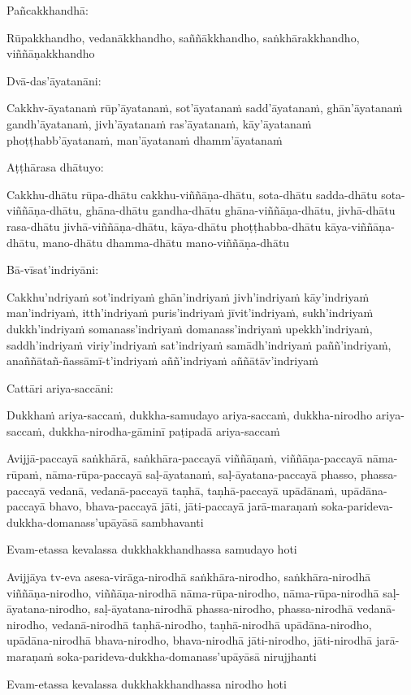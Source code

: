 \begin{paritta}

Pañcakkhandhā:

Rūpakkhandho, vedanākkhandho, saññākkhandho, saṅkhārakkhandho,
viññāṇakkhandho

Dvā-das'āyatanāni:

Cakkhv-āyatanaṁ rūp'āyatanaṁ, sot'āyatanaṁ sadd'āyatanaṁ, ghān'āyatanaṁ
gandh'āyatanaṁ, jivh'āyatanaṁ ras'āyatanaṁ, kāy'āyatanaṁ
phoṭṭhabb'āyatanaṁ, man'āyatanaṁ dhamm'āyatanaṁ

Aṭṭhārasa dhātuyo:

Cakkhu-dhātu rūpa-dhātu cakkhu-viññāṇa-dhātu, sota-dhātu sadda-dhātu
sota-viññāṇa-dhātu, ghāna-dhātu gandha-dhātu ghāna-viññāṇa-dhātu,
jivhā-dhātu rasa-dhātu jivhā-viññāṇa-dhātu, kāya-dhātu phoṭṭhabba-dhātu
kāya-viññāṇa-dhātu, mano-dhātu dhamma-dhātu mano-viññāṇa-dhātu

Bā-vīsat'indriyāni:

Cakkhu'ndriyaṁ sot'indriyaṁ ghān'indriyaṁ jivh'indriyaṁ kāy'indriyaṁ
man'indriyaṁ, itth'indriyaṁ puris'indriyaṁ jīvit'indriyaṁ, sukh'indriyaṁ
dukkh'indriyaṁ somanass'indriyaṁ domanass'indriyaṁ upekkh'indriyaṁ,
saddh'indriyaṁ viriy'indriyaṁ sat'indriyaṁ samādh'indriyaṁ
paññ'indriyaṁ, anaññātañ-ñassāmī-t'indriyaṁ aññ'indriyaṁ
aññātāv'indriyaṁ

Cattāri ariya-saccāni:

Dukkhaṁ ariya-saccaṁ, dukkha-samudayo ariya-saccaṁ, dukkha-nirodho
ariya-saccaṁ, dukkha-nirodha-gāminī paṭipadā ariya-saccaṁ

Avijjā-paccayā saṅkhārā, saṅkhāra-paccayā viññāṇaṁ, viññāṇa-paccayā
nāma-rūpaṁ, nāma-rūpa-paccayā saḷ-āyatanaṁ, saḷ-āyatana-paccayā phasso,
phassa-paccayā vedanā, vedanā-paccayā taṇhā, taṇhā-paccayā upādānaṁ,
upādāna-paccayā bhavo, bhava-paccayā jāti, jāti-paccayā jarā-maraṇaṁ
soka-parideva-dukkha-domanass'upāyāsā sambhavanti

Evam-etassa kevalassa dukkhakkhandhassa samudayo hoti

Avijjāya tv-eva asesa-virāga-nirodhā saṅkhāra-nirodho, saṅkhāra-nirodhā
viññāṇa-nirodho, viññāṇa-nirodhā nāma-rūpa-nirodho, nāma-rūpa-nirodhā
saḷ-āyatana-nirodho, saḷ-āyatana-nirodhā phassa-nirodho, phassa-nirodhā
vedanā-nirodho, vedanā-nirodhā taṇhā-nirodho, taṇhā-nirodhā
upādāna-nirodho, upādāna-nirodhā bhava-nirodho, bhava-nirodhā
jāti-nirodho, jāti-nirodhā jarā-maraṇaṁ
soka-parideva-dukkha-domanass'upāyāsā nirujjhanti

Evam-etassa kevalassa dukkhakkhandhassa nirodho hoti

\end{paritta}

